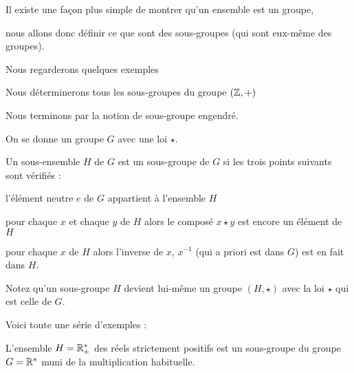 





\debuttexte

\diapo

\change

Il existe une façon plus simple de montrer qu'un ensemble est un
groupe,

\change

 nous allons donc définir ce que sont des sous-groupes 
(qui sont eux-même des groupes).

\change

Nous regarderons quelques exemples


\change

Nous déterminerons tous les sous-groupes du groupe $(\mathbb{Z},+)$

\change

Nous terminons par la notion de sous-groupe engendré.

\diapo

On se donne un groupe $G$ avec une loi $\star$.

Un sous-ensemble $H$ de $G$ est un sous-groupe de $G$ si les trois points suivants
sont vérifiés :

\change

l'élément neutre $e$ de $G$ appartient à l'ensemble $H$

\change

pour chaque $x$ et chaque $y$ de $H$ alors le composé $x \star y$ est encore un élément de $H$

\change

pour chaque $x$ de $H$ alors l'inverse de $x$, $x^{-1}$ (qui a priori est dans $G$)
est en fait dans $H$.

\change

Notez qu'un sous-groupe $H$ devient lui-même un groupe
$(H,\star)$ avec la loi $\star$ qui est celle de $G$.


\diapo

Voici toute une série d'exemples :

L'ensemble $H=\mathbb{R}_+^*$ des réels strictement positifs est un sous-groupe
 du groupe $G=\mathbb{R}^*$ muni de la multiplication habituelle.

